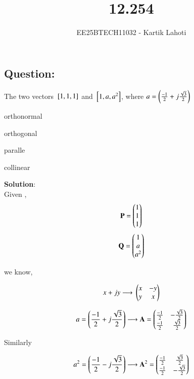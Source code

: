 \documentclass[journal]{IEEEtran}
\numberwithin{equation}{enumi}
\numberwithin{figure}{enumi}
\begin{document}

\vspace{3cm}

\title{12.254}
\author{EE25BTECH11032 - Kartik Lahoti}
\maketitle

\subsection*{Question: } 

The two vectors ${}\left[1,1,1\right]$ and ${}\left[1,a,a^2\right]$, where $a = \left(\frac{-1}{2} + j\frac{\sqrt{3}}{2}\right)$

\begin{enumerate}
    \begin{multicols}{4}
        \item orthonormal
        \item orthogonal
        \item paralle
        \item collinear
    \end{multicols}
\end{enumerate}

\textbf{Solution}:\\

Given , 
\begin{align}
    \mathbf{P} = \begin{pmatrix}1\\1\\1\end{pmatrix} 
\end{align}
\begin{align}
    \mathbf{Q} = \begin{pmatrix}1\\a\\a^2\end{pmatrix} 
\end{align}

we know, 

\begin{align}
    x+jy \longrightarrow{} \begin{pmatrix}x & -y \\ y & x \end{pmatrix}
\end{align}

\begin{align}
    a = \left(\frac{-1}{2} + j\frac{\sqrt{3}}{2}\right) \longrightarrow \mathbf{A} = \begin{pmatrix}\frac{-1}{2}&-\frac{\sqrt{3}}{2}\\\frac{-1}{2} & \frac{\sqrt{3}}{2}\end{pmatrix}
\end{align}

Similarly 

\begin{align}
    a^2 = \left(\frac{-1}{2} - j\frac{\sqrt{3}}{2}\right) \longrightarrow \mathbf{A}^2 = \begin{pmatrix}\frac{-1}{2}&\frac{\sqrt{3}}{2}\\\frac{-1}{2} & -\frac{\sqrt{3}}{2}\end{pmatrix}
\end{align}
\end{document}
